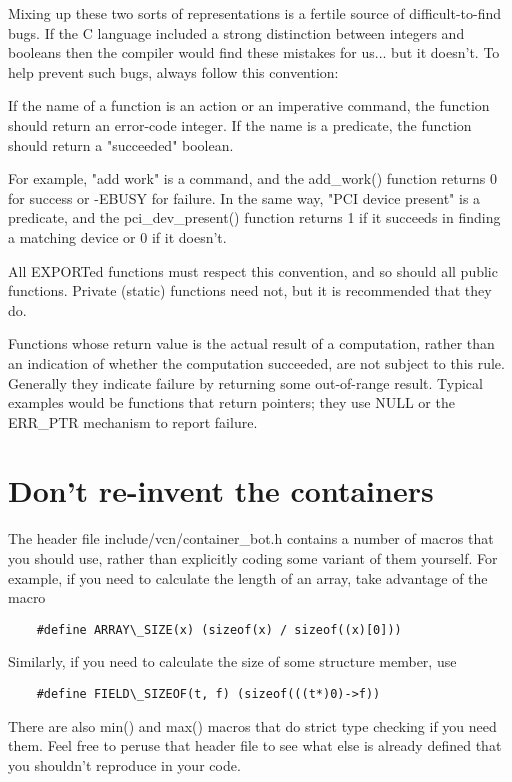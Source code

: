 \documentclass[pdftex,12pt, twocol]{article} %
\begin{document}
Mixing up these two sorts of representations is a fertile source of
difficult-to-find bugs.  If the C language included a strong distinction
between integers and booleans then the compiler would find these mistakes
for us... but it doesn't.  To help prevent such bugs, always follow this
convention:

	If the name of a function is an action or an imperative command,
	the function should return an error-code integer.  If the name
	is a predicate, the function should return a "succeeded" boolean.

For example, "add work" is a command, and the add\_work() function returns 0
for success or -EBUSY for failure.  In the same way, "PCI device present" is
a predicate, and the pci\_dev\_present() function returns 1 if it succeeds in
finding a matching device or 0 if it doesn't.

All EXPORTed functions must respect this convention, and so should all
public functions.  Private (static) functions need not, but it is
recommended that they do.

Functions whose return value is the actual result of a computation, rather
than an indication of whether the computation succeeded, are not subject to
this rule.  Generally they indicate failure by returning some out-of-range
result.  Typical examples would be functions that return pointers; they use
NULL or the ERR\_PTR mechanism to report failure.


\section{Don't re-invent the containers}

The header file include/vcn/container\_bot.h contains a number of macros that
you should use, rather than explicitly coding some variant of them yourself.
For example, if you need to calculate the length of an array, take advantage
of the macro

\begin{verbatim}
	#define ARRAY\_SIZE(x) (sizeof(x) / sizeof((x)[0]))
\end{verbatim}

Similarly, if you need to calculate the size of some structure member, use

\begin{verbatim}
	#define FIELD\_SIZEOF(t, f) (sizeof(((t*)0)->f))
\end{verbatim}

There are also min() and max() macros that do strict type checking if you
need them.  Feel free to peruse that header file to see what else is already
defined that you shouldn't reproduce in your code.
\end{document}
